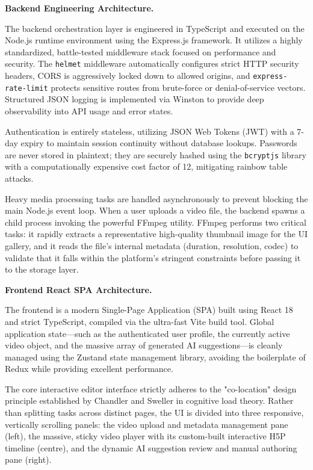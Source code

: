 \textbf{Backend Engineering Architecture.}

The backend orchestration layer is engineered in TypeScript and executed on the Node.js runtime environment using the Express.js framework. It utilizes a highly standardized, battle-tested middleware stack focused on performance and security. The \texttt{helmet} middleware automatically configures strict HTTP security headers, CORS is aggressively locked down to allowed origins, and \texttt{express-rate-limit} protects sensitive routes from brute-force or denial-of-service vectors. Structured JSON logging is implemented via Winston to provide deep observability into API usage and error states.

Authentication is entirely stateless, utilizing JSON Web Tokens (JWT) with a 7-day expiry to maintain session continuity without database lookups. Passwords are never stored in plaintext; they are securely hashed using the \texttt{bcryptjs} library with a computationally expensive cost factor of 12, mitigating rainbow table attacks. 

Heavy media processing tasks are handled asynchronously to prevent blocking the main Node.js event loop. When a user uploads a video file, the backend spawns a child process invoking the powerful FFmpeg utility. FFmpeg performs two critical tasks: it rapidly extracts a representative high-quality thumbnail image for the UI gallery, and it reads the file's internal metadata (duration, resolution, codec) to validate that it falls within the platform's stringent constraints before passing it to the storage layer.

\textbf{Frontend React SPA Architecture.}

The frontend is a modern Single-Page Application (SPA) built using React 18 and strict TypeScript, compiled via the ultra-fast Vite build tool. Global application state—such as the authenticated user profile, the currently active video object, and the massive array of generated AI suggestions—is cleanly managed using the Zustand state management library, avoiding the boilerplate of Redux while providing excellent performance.

The core interactive editor interface strictly adheres to the "co-location" design principle established by Chandler and Sweller in cognitive load theory. Rather than splitting tasks across distinct pages, the UI is divided into three responsive, vertically scrolling panels: the video upload and metadata management pane (left), the massive, sticky video player with its custom-built interactive H5P timeline (centre), and the dynamic AI suggestion review and manual authoring pane (right).

